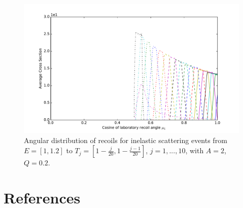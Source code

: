 \documentclass[review]{elsarticle}
\begin{document}
\begin{figure}[p]
	\centering
	\includegraphics[width=1\linewidth]{inelastic_vs_angle.pdf}
	\caption{Angular distribution of recoils for inelastic scattering events from $E=[1,1.2]$ to $T_j = [1-\frac{j}{20},  1-\frac{j-1}{20}]$, $j=1,...,10$, with $A=2$, $Q=0.2$.}
	\label{fig:inelastic_vs_angle}
\end{figure}

\clearpage
\section*{References}

\end{document}
